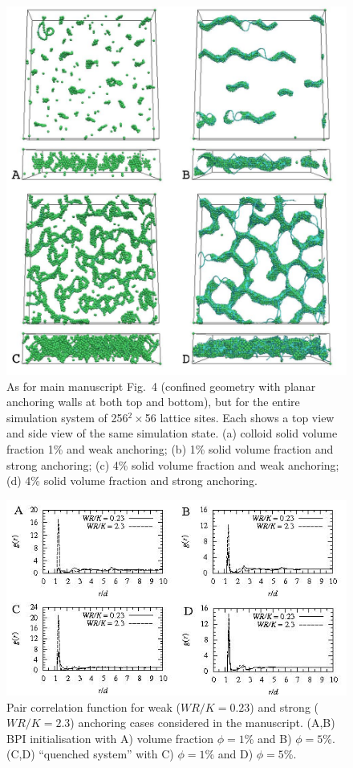 \documentclass[12pt,twoside]{article}
\begin{document}
\begin{figure}
\begin{center}
\includegraphics[scale=0.42]{s4.jpg}
\end{center}
\caption{As for main manuscript Fig.~4 (confined geometry with planar
anchoring walls at both top and bottom), but for the entire simulation
system of 256$^2\times$56 lattice sites. Each shows a top view and
side view of the same simulation state. (a) colloid solid volume fraction 1\%
and weak anchoring; (b) 1\% solid volume fraction and strong anchoring;
(c) 4\% solid volume fraction and weak anchoring; (d) 4\% solid
volume fraction and strong anchoring.}
\end{figure}

\begin{figure}
\begin{center}
\includegraphics[width=0.95\columnwidth]{s5.jpg}
\end{center}
\caption{Pair correlation function for weak ($WR/K=0.23$) and strong ($WR/K=2.3$) anchoring cases considered in the manuscript. (A,B) BPI initialisation with A) volume fraction $\phi=1${\%} and B) $\phi=5${\%}. (C,D) ``quenched system'' with C) $\phi=1${\%} and D) $\phi=5${\%}.}
\end{figure}
\end{document}
